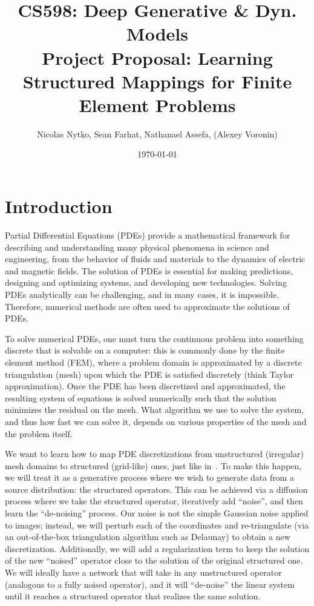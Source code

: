 \documentclass{article}
\title{CS598: Deep Generative \& Dyn. Models\\
       Project Proposal: Learning Structured Mappings for Finite Element Problems}
\author{Nicolas Nytko, Sean Farhat, Nathanael Assefa, (Alexey Voronin)}
\date{\today}
\begin{document}
\maketitle

\section{Introduction}

Partial Differential Equations (PDEs) provide a mathematical framework for describing and understanding many physical phenomena in science and engineering, from the behavior of fluids and materials to the dynamics of electric and magnetic fields. The solution of PDEs is essential for making predictions, designing and optimizing systems, and developing new technologies. Solving PDEs analytically can be challenging, and in many cases, it is impossible. Therefore, numerical methods are often used to approximate the solutions of PDEs.

To solve numerical PDEs, one must turn the continuous problem into something discrete that is solvable on a computer: this is commonly done by the finite element method (FEM), where a problem domain is approximated by a discrete triangulation (mesh) upon which the PDE is satisfied discretely (think Taylor approximation). Once the PDE has been discretized and approximated, the resulting system of equations is solved numerically such that the solution minimizes the residual on the mesh.  What algorithm we use to solve the system, and thus how fast we can solve it, depends on various properties of the mesh and the problem itself.

We want to learn how to map PDE discretizations from unstructured (irregular) mesh domains to structured (grid-like) ones, just like in~. To make this happen, we will treat it as a generative process where we wish to generate data from a source distribution: the structured operators. This can be achieved via a diffusion process where we take the structured operator, iteratively add ``noise'', and then learn the ``de-noising'' process.  Our noise is not the simple Gaussian noise applied to images; instead, we will perturb each of the coordinates and re-triangulate (via an out-of-the-box triangulation algorithm such as Delaunay) to obtain a new discretization. Additionally, we will add a regularization term to keep the solution of the new ``noised'' operator close to the solution of the original structured one. We will ideally have a network that will take in any unstructured operator (analogous to a fully noised operator), and it will ``de-noise'' the linear system until it reaches a structured operator that realizes the same solution.
\end{document}
